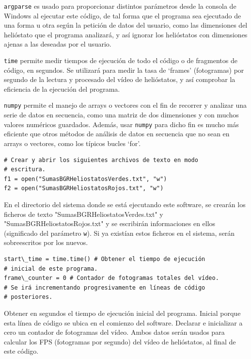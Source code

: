 \verb|argparse| es usado para proporcionar distintos parámetros desde la consola de Windows al ejecutar este código, de tal forma que el programa sea ejecutado de una forma u otra según la petición de datos del usuario, como las dimensiones del helióstato que el programa analizará, y así ignorar los helióstatos con dimensiones ajenas a las deseadas por el usuario.

\verb|time| permite medir tiempos de ejecución de todo el código o de fragmentos de código, en segundos. Se utilizará para medir la tasa de ‘frames’ (fotogramas) por segundo de la lectura y procesado del vídeo de helióstatos, y así comprobar la eficiencia de la ejecución del programa.

\verb|numpy| permite el manejo de arrays o vectores con el fin de recorrer y analizar una serie de datos en secuencia, como una matriz de dos dimensiones y con muchos valores numéricos guardados. Además, usar \verb|numpy| para dicho fin es mucho más eficiente que otros métodos de análisis de datos en secuencia que no sean en arrays o vectores, como los típicos bucles ‘for’.\\[20pt]

\begin{lstlisting}
# Crear y abrir los siguientes archivos de texto en modo
# escritura.
f1 = open("SumasBGRHeliostatosVerdes.txt", "w")
f2 = open("SumasBGRHeliostatosRojos.txt", "w")
\end{lstlisting}

En el directorio del sistema donde se está ejecutando este software, se crearán los ficheros de texto "SumasBGRHeliostatosVerdes.txt" y "SumasBGRHeliostatosRojos.txt" y se escribirán informaciones en ellos (significado del parámetro \verb|w|). Si ya existían estos ficheros en el sistema, serán sobreescritos por los nuevos.\\[20pt]

\begin{lstlisting}
start\_time = time.time() # Obtener el tiempo de ejecución
# inicial de este programa.
frame\_counter = 0 # Contador de fotogramas totales del vídeo.
# Se irá incrementando progresivamente en líneas de código
# posteriores.
\end{lstlisting}

Obtener en segundos el tiempo de ejecución inicial del programa. Inicial porque esta línea de código se ubica en el comienzo del software. Declarar e inicializar a cero un contador de fotogramas del vídeo. Ambos datos serán usados para calcular los FPS (fotogramas por segundo) del vídeo de helióstatos, al final de este código.\\[20pt]

